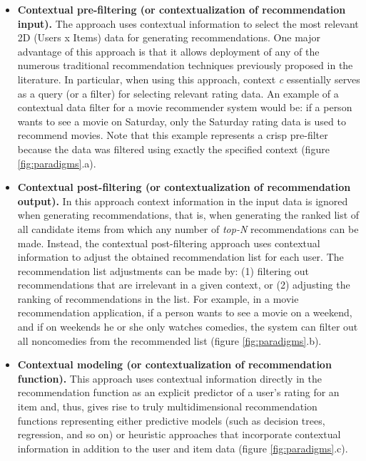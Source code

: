 \begin{itemize}
\item \textbf{Contextual pre-filtering (or contextualization of
recommendation input).} The approach uses contextual information to
select the most relevant 2D (Users x Items) data for generating
recommendations. One major advantage of this approach is that it
allows deployment of any of the numerous traditional recommendation
techniques previously proposed in the literature\cite{adomavicius2005toward}.
In particular, when using this approach, context
\textit{c} essentially serves as a query (or a filter) for selecting
relevant rating data. An example of a contextual data filter for a
movie recommender system would be: if a person wants to see a movie on
Saturday, only the Saturday rating data is used to recommend movies.
Note that this example represents a crisp pre-filter because the data
was filtered using exactly the specified context (figure
\ref{fig:paradigms}.a).
\item \textbf{Contextual post-filtering (or contextualization of
recommendation output).} In this approach context information
in the input data is ignored when generating recommendations, that is, when
generating the ranked list of all candidate items from which any
number of \textit{top-N} recommendations can be made. Instead,  the
contextual post-filtering approach uses contextual information to
adjust the obtained recommendation list for each user. The
recommendation list adjustments can be made by: (1) filtering out
recommendations that are irrelevant in a given context, or (2)
adjusting the ranking of recommendations in the list. For example, in
a movie recommendation application, if a person wants to see a movie
on a weekend, and if on weekends he or she only watches comedies, the
system can filter out all noncomedies from the recommended list
(figure \ref{fig:paradigms}.b).
\item \textbf{Contextual modeling (or contextualization of
recommendation function).} This approach uses contextual information
directly in the recommendation function as an explicit predictor of a
user's rating for an item and, thus, gives rise to truly
multidimensional recommendation functions representing either
predictive models (such as decision trees, regression, and so on) or
heuristic approaches that incorporate contextual information in
addition to the user and item data (figure \ref{fig:paradigms}.c).\\
\end{itemize}
